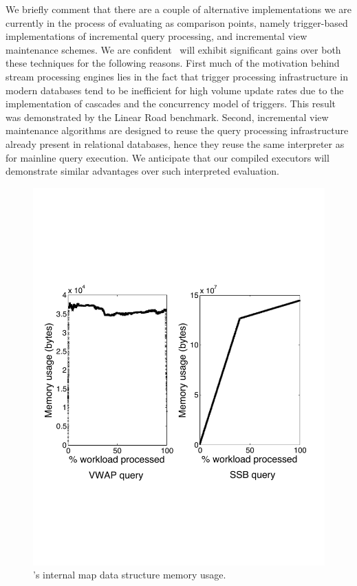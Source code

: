 We briefly comment that there are a couple of alternative implementations we
are currently in the process of evaluating as comparison points, namely
trigger-based implementations of incremental query processing, and incremental
view maintenance schemes. We are confident \compiler\ will exhibit significant
gains over both these techniques for the following reasons. First much of the
motivation behind stream processing engines lies in the fact that trigger
processing infrastructure in modern databases tend to be inefficient for
high volume update rates due to the implementation of cascades and the
concurrency model of triggers. This result was demonstrated by the Linear Road
benchmark. Second, incremental view maintenance algorithms are designed to
reuse the query processing infrastructure already present in relational
databases, hence they reuse the same interpreter as for mainline query
execution. We anticipate that our compiled executors will demonstrate
similar advantages over such interpreted evaluation.

\begin{figure}[h]
\begin{center}
\includegraphics[scale=0.44]{../plots/mem_usage.pdf}
\end{center}
\vspace{-4mm}
\caption{\compiler's internal map data structure memory usage.}
\label{fig:memusage}
\end{figure}


